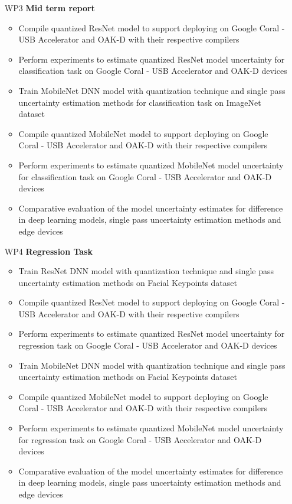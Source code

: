 \documentclass[rnd]{mas_proposal}
\begin{document}
\begin{enumerate}
    \item[WP3] \textbf{Mid term report}
        \begin{itemize}
        \item Compile quantized ResNet model to support deploying on Google Coral - USB Accelerator and OAK-D with their respective compilers
        \item Perform experiments to estimate quantized ResNet model uncertainty for classification task on Google Coral - USB Accelerator and OAK-D devices
        \item Train MobileNet\cite{howard2017mobilenets} DNN model with quantization technique and single pass uncertainty estimation methods for classification task on ImageNet dataset
        \item Compile quantized MobileNet model to support deploying on Google Coral - USB Accelerator and OAK-D with their respective compilers
        \item Perform experiments to estimate quantized MobileNet model uncertainty for classification task on Google Coral - USB Accelerator and OAK-D devices
        \item Comparative evaluation of the model uncertainty estimates for difference in deep learning models, single pass uncertainty estimation methods and edge devices
        \end{itemize}
        
    \item[WP4] \textbf{Regression Task}
        \begin{itemize}
        \item Train ResNet DNN model with quantization technique and single pass uncertainty estimation methods on Facial Keypoints dataset
        \item Compile quantized ResNet model to support deploying on Google Coral - USB Accelerator and OAK-D with their respective compilers
        \item Perform experiments to estimate quantized ResNet model uncertainty for regression task on Google Coral - USB Accelerator and OAK-D devices
        \item Train MobileNet DNN model with quantization technique and single pass uncertainty estimation methods on Facial Keypoints dataset\cite{facialkey}
        \item Compile quantized MobileNet model to support deploying on Google Coral - USB Accelerator and OAK-D with their respective compilers
        \item Perform experiments to estimate quantized MobileNet model uncertainty for regression task on Google Coral - USB Accelerator and OAK-D devices
        \item Comparative evaluation of the model uncertainty estimates for difference in deep learning models, single pass uncertainty estimation methods and edge devices
        \end{itemize}
        

\end{enumerate}
\end{document}

